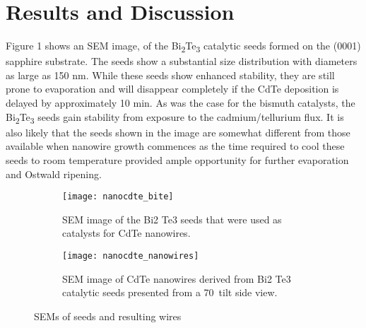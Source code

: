 \section{Results and Discussion}
Figure 1 shows an SEM image, of the Bi\textsubscript{2}Te\textsubscript{3}
catalytic seeds formed on the (0001) sapphire substrate. The
seeds show a substantial size distribution with diameters
as large as 150 nm. While these seeds show enhanced
stability, they are still prone to evaporation and will disappear
completely if the CdTe deposition is delayed by approximately
10 min. As was the case for the bismuth catalysts, the Bi\textsubscript{2}Te\textsubscript{3}
seeds gain stability from exposure to the cadmium/tellurium
flux. It is also likely that the seeds shown in the image
are somewhat different from those available when nanowire
growth commences as the time required to cool these seeds
to room temperature provided ample opportunity for further
evaporation and Ostwald ripening.
\begin{figure}
    \centering
    \begin{subfigure}[t]{0.5\textwidth}
        \centering
        \texttt{[image: nanocdte\_bite]}
        \caption{\label{fig:nanocdte_bite}SEM image of the Bi2 Te3 seeds that were used as catalysts 
            for CdTe nanowires.}
    \end{subfigure}%
    \begin{subfigure}[t]{0.5\textwidth}
        \centering
        \texttt{[image: nanocdte\_nanowires]}
        \caption{\label{fig:nanocdte_nanowires} SEM image of CdTe nanowires derived from Bi2 Te3
            catalytic seeds presented from a 70\degree~tilt side view.}
    \end{subfigure}
    \caption{\label{fig:nanocdte_sem}SEMs of seeds and resulting wires}
\end{figure}

